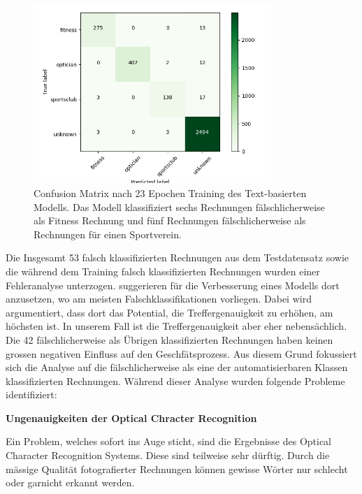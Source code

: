 \begin{figure}[h!] 
    \caption{Confusion Matrix nach 23 Epochen Training des Text-basierten Modells. Das Modell klassifiziert sechs Rechnungen fälschlicherweise als Fitness Rechnung und fünf Rechnungen fälschlicherweise als Rechnungen für einen Sportverein.}
    \label{text-classification-cm}
    \centering
    \includegraphics[width=0.8\textwidth]{graphics/text-classification/cm_22.png}
\end{figure}

Die Insgesamt 53 falsch klassifizierten Rechnungen aus dem Testdatensatz sowie die während dem Training falsch klassifizierten Rechnungen wurden einer Fehleranalyse unterzogen. \textcite{MLYearning} suggerieren für die Verbesserung eines Modells dort anzusetzen, wo am meisten Falschklassifikationen vorliegen. Dabei wird argumentiert, dass dort das Potential, die Treffergenauigkeit zu erhöhen, am höchsten ist. In unserem Fall ist die Treffergenauigkeit aber eher nebensächlich. Die 42 fälschlicherweise als Übrigen klassifizierten Rechnungen haben keinen grossen negativen Einfluss auf den Geschfätsprozess. Aus diesem Grund fokussiert sich die Analyse auf die fälschlicherweise als eine der automatisierbaren Klassen klassifizierten Rechnungen. Während dieser Analyse wurden folgende Probleme identifiziert:

\textbf{Ungenauigkeiten der Optical Chracter Recognition}

Ein Problem, welches sofort ins Auge sticht, sind die Ergebnisse des Optical Character Recognition Systems. Diese sind teilweise sehr dürftig. Durch die mässige Qualität fotografierter Rechnungen können gewisse Wörter nur schlecht oder garnicht erkannt werden. 

